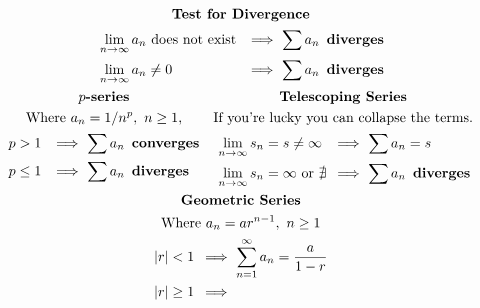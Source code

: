 \begingroup
\begin{center}
\begin{footnotesize}
\setlength\jot{1em}
\[
\begin{gathered}
\begin{gathered}[t]\textbf{Test for Divergence}\\
\begin{alignedat}{2} &
  \lim_{n\to\infty}a_n\ \text{does not exist}\;
    &\enspace\implies\ &
  {\small\sum}\,a_n\enspace\mathbf{diverges}
  \\ &
  \lim_{n\to\infty}a_n \ne 0
    &\enspace\implies\ &
  {\small\sum}\,a_n\enspace\mathbf{diverges}
\end{alignedat}\end{gathered}
\\%
\begin{gathered}[t]\textbf{\(p\)-series}\\
\text{Where \(a_n=1/n^p,\ n\ge1\),}\\
\begin{alignedat}{2} &
  p>1\;
    &\enspace\implies\ &
  {\small\sum}\,a_n\enspace\mathbf{converges}
\\ &
  p\le1\;
    &\enspace\implies\ &
  {\small\sum}\,a_n\enspace\mathbf{diverges}
\end{alignedat}\end{gathered}
\quad
\begin{gathered}[t]\textbf{Telescoping Series}\\
\text{If you're lucky you can collapse the terms.}\\
\begin{alignedat}{2} &
  \lim_{n\to\infty}s_n=s\ne\infty
    &\enspace\implies\ &
  {\small\sum}\,a_n= s
  \\ &
  \lim_{n\to\infty}s_n=\infty\text{ or }\nexists
    &\enspace\implies\ &
  {\small\sum}\,a_n\enspace\mathbf{diverges}
\end{alignedat}\end{gathered}
\\
\begin{gathered}[t]\textbf{Geometric Series}\\
\text{Where \(a_n=ar^{n-1},\ n\ge1\)}\\
\begin{alignedat}{2} &
  |r|<1
    &\enspace\implies\ &
  {\small\sum_{n=1}^\infty}\,a_n= \frac{a}{1-r}
  \\ &
  |r|\ge1
    &\enspace\implies\ &

\end{alignedat}
\end{gathered}
\end{gathered}\]
\end{footnotesize}
\end{center}
